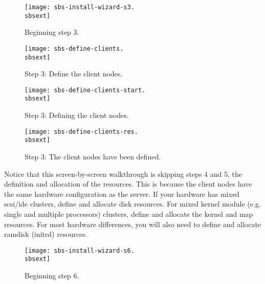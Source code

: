 \begin{figure}[htbp]
  \begin{center}
    \texttt{[image: sbs-install-wizard-s3.\\sbsext]}
    \caption{Beginning step 3.}
    \label{fig:sbs-install-wizard-s3}
  \end{center}
\end{figure}

\begin{figure}[htbp]
  \begin{center}
    \texttt{[image: sbs-define-clients.\\sbsext]}
    \caption{Step 3: Define the client nodes.}
    \label{fig:sbs-define-clients}
  \end{center}
\end{figure}

\begin{figure}[htbp]
  \begin{center}
    \texttt{[image: sbs-define-clients-start.\\sbsext]}
    \caption{Step 3: Defining the client nodes.}
    \label{fig:sbs-define-clients-start}
  \end{center}
\end{figure}

\begin{figure}[htbp]
  \begin{center}
    \texttt{[image: sbs-define-clients-res.\\sbsext]}
    \caption{Step 3: The client nodes have been defined.}
    \label{fig:sbs-define-clients-res}
  \end{center}
\end{figure}

Notice that this screen-by-screen walkthrough is skipping steps 4 and 5,
the definition and allocation of the resources.  This is because the client
nodes have the same hardware configuration as the server.  If your hardware
has mixed scsi/ide clusters, define and allocate disk resources.  For mixed
kernel module (e.g. single and multiple processors) clusters, define and
allocate the kernel and map resources.  For most hardware differences,
you will also need to define and allocate ramdisk (initrd) resources.

\begin{figure}[htbp]
  \begin{center}
    \texttt{[image: sbs-install-wizard-s6.\\sbsext]}
    \caption{Beginning step 6.}
    \label{fig:sbs-install-wizard-s6}
  \end{center}
\end{figure}

